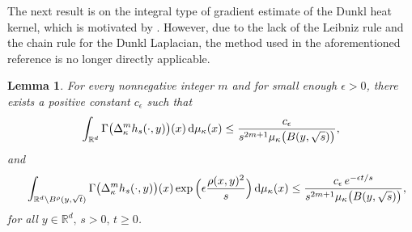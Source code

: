 \documentclass[11pt,a4paper]{article}
\def\R{\mathbb{R}}
\def\d{\textup{d}}
\newtheorem{lemma}[theorem]{Lemma}
\theoremstyle{definition}\newtheorem{remark}[theorem]{Remark}
\begin{document}
The next result is on the integral type of gradient estimate of the Dunkl heat kernel, which is motivated by \cite[Lemma 3.3]{CDD}. However, due to the lack of the Leibniz rule and the chain rule for the Dunkl Laplacian, the method used in the aforementioned reference is no longer directly applicable.
\begin{lemma}\label{lemma-2}
For every nonnegative integer $m$ and for small enough $\epsilon>0$, there exists a positive constant $c_\epsilon$ such that
\begin{eqnarray}\label{int-Gamma-kernel-bd-1}
\int_{\R^d}\Gamma\big(\Delta_{\kappa}^m h_s(\cdot,y)\big)(x)\,\d\mu_\kappa(x)\leq\frac{c_\epsilon}{s^{2m+1}\mu_\kappa\big(B(y,\sqrt{s})\big)},
\end{eqnarray}
and
\begin{eqnarray}\label{int-Gamma-kernel-bd-2}
&&\int_{\R^d\setminus B^\rho(y,\sqrt{t})}\Gamma\big(\Delta_{\kappa}^m h_s(\cdot,y)\big)(x)\exp\Big(\epsilon\frac{\rho(x,y)^2}{s}\Big)\,\d\mu_\kappa(x)
\leq\frac{c_\epsilon \,e^{-\epsilon t/s}}{s^{2m+1}\mu_\kappa\big(B(y,\sqrt{s})\big)},
\end{eqnarray}
for all $y\in\R^d,\,s>0,\,t\geq0$.
\end{lemma}
\end{document}
